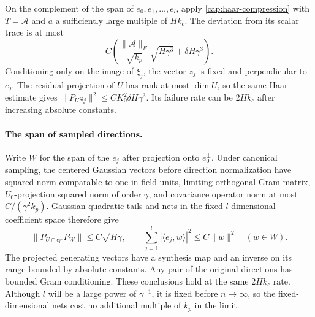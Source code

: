 On the complement of the span of $e_0,e_1,\ldots,e_l$, apply
\eqref{cap:haar-compression} with $T=\mathcal A$ and $a$ a sufficiently large
multiple of $Hk_c$. The deviation from its scalar trace is at most
\begin{equation}\label{cap:ordinary-compression}
 C\left(\frac{\|\mathcal A\|_F}{\sqrt{k_p}}
                      \sqrt{H\gamma^3}
             +\delta H\gamma^3\right).
\end{equation}
Conditioning only on the image of $\xi_j$, the vector $z_j$ is fixed and
perpendicular to $e_j$. The residual projection of $U$ has rank at most
$\dim U$, so the same Haar estimate gives
$\|P_Uz_j\|^2\le C K_0^2\delta H\gamma^3$.
Its failure rate can be $2Hk_c$ after increasing absolute constants.

\paragraph{The span of sampled directions.}
Write $W$ for the span of the $e_j$ after projection onto $e_0^\perp$.
Under canonical sampling, the centered Gaussian vectors before direction
normalization have squared norm comparable to one in field units, limiting
orthogonal Gram matrix, $U_0$-projection squared norm of order $\gamma$,
and covariance operator norm at most $C/(\gamma^2k_p)$. Gaussian quadratic
tails and nets in the fixed $l$-dimensional coefficient space therefore give
\begin{equation}\label{cap:exceptional-span-geometry}
 \|P_{U\cap e_0^\perp}P_W\|\le C\sqrt{H\gamma},\qquad
 \sum_{j=1}^l |\langle e_j,w\rangle|^2\le C\|w\|^2
 \quad(w\in W).
\end{equation}
The projected generating vectors have a synthesis map and an inverse on its
range bounded by absolute constants. Any pair of the original directions has
bounded Gram conditioning. These conclusions hold at the same $2Hk_c$ rate.
Although $l$ will be a large power of $\gamma^{-1}$, it is fixed before
$n\to\infty$, so the fixed-dimensional nets cost no additional multiple of
$k_p$ in the limit.

